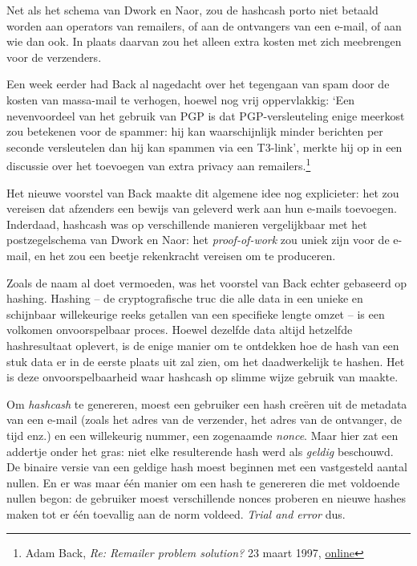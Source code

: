 \documentclass[
  a5paper,
  smalldemyvopaper,11pt,twoside,onecolumn,openright,extrafontsizes,
hidelinks]{memoir}
\begin{document}
Net als het schema van Dwork en Naor, zou de hashcash porto niet betaald
worden aan operators van remailers, of aan de ontvangers van een e-mail,
of aan wie dan ook. In plaats daarvan zou het alleen extra kosten met
zich meebrengen voor de verzenders.

Een week eerder had Back al nagedacht over het tegengaan van spam door
de kosten van massa-mail te verhogen, hoewel nog vrij oppervlakkig: `Een
nevenvoordeel van het gebruik van PGP is dat PGP-versleuteling enige
meerkost zou betekenen voor de spammer: hij kan waarschijnlijk minder
berichten per seconde versleutelen dan hij kan spammen via een T3-link',
merkte hij op in een discussie over het toevoegen van extra privacy aan
remailers.\footnote{Adam Back, \emph{Re: Remailer problem solution?} 23
  maart 1997,
  \href{https://cypherpunks.venona.com/date/1997/03/msg00631.html}{online}}

Het nieuwe voorstel van Back maakte dit algemene idee nog explicieter:
het zou vereisen dat afzenders een bewijs van geleverd werk aan hun
e-mails toevoegen. Inderdaad, hashcash was op verschillende manieren
vergelijkbaar met het postzegelschema van Dwork en Naor: het
\emph{proof-of-work} zou uniek zijn voor de e-mail, en het zou een
beetje rekenkracht vereisen om te produceren.

Zoals de naam al doet vermoeden, was het voorstel van Back echter
gebaseerd op hashing. Hashing -- de cryptografische truc die alle data
in een unieke en schijnbaar willekeurige reeks getallen van een
specifieke lengte omzet -- is een volkomen onvoorspelbaar proces. Hoewel
dezelfde data altijd hetzelfde hashresultaat oplevert, is de enige
manier om te ontdekken hoe de hash van een stuk data er in de eerste
plaats uit zal zien, om het daadwerkelijk te hashen. Het is deze
onvoorspelbaarheid waar hashcash op slimme wijze gebruik van maakte.

Om \emph{hashcash} te genereren, moest een gebruiker een hash creëren
uit de metadata van een e-mail (zoals het adres van de verzender, het
adres van de ontvanger, de tijd enz.) en een willekeurig nummer, een
zogenaamde \emph{nonce}. Maar hier zat een addertje onder het gras: niet
elke resulterende hash werd als \emph{geldig} beschouwd. De binaire
versie van een geldige hash moest beginnen met een vastgesteld aantal
nullen. En er was maar één manier om een hash te genereren die met
voldoende nullen begon: de gebruiker moest verschillende nonces proberen
en nieuwe hashes maken tot er één toevallig aan de norm voldeed.
\emph{Trial and error} dus.
\end{document}

